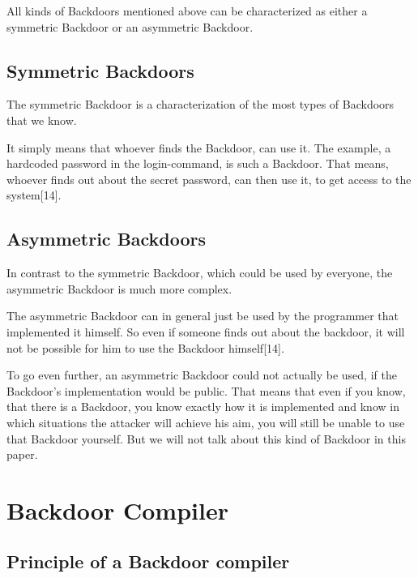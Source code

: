 \documentclass[a4paper, 12pt]{article}
\begin{document}
All kinds of Backdoors mentioned above can be characterized as either a symmetric Backdoor or an asymmetric Backdoor.

\newpage

\subsection{Symmetric Backdoors}

The symmetric Backdoor is a characterization of the most types of Backdoors that we know.

It simply means that whoever finds the Backdoor, can use it. The example, a hardcoded password in the login-command, is such a Backdoor. That means, whoever finds out about the secret password, can then use it, to get access to the system[14].

\subsection{Asymmetric Backdoors}

In contrast to the symmetric Backdoor, which could be used by everyone, the asymmetric Backdoor is much more complex. 

The asymmetric Backdoor can in general just be used by the programmer that implemented it himself. So even if someone finds out about the backdoor, it will not be possible for him to use the Backdoor himself[14].

To go even further, an asymmetric Backdoor could not actually be used, if the Backdoor's implementation would be public. That means that even if you know, that there is a Backdoor, you know exactly how it is implemented and know in which situations the attacker will achieve his aim, you will still be unable to use that Backdoor yourself. But we will not talk about this kind of Backdoor in this paper.

\newpage


\section{Backdoor Compiler}

\subsection{Principle of a Backdoor compiler}
\end{document}
